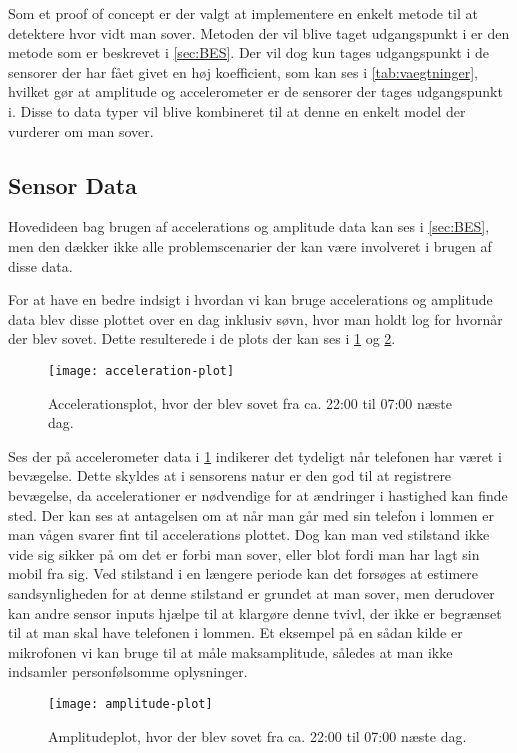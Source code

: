 Som et proof of concept er der valgt at implementere en enkelt metode til at detektere hvor vidt man sover.
Metoden der vil blive taget udgangspunkt i er den metode som er beskrevet i \cref{sec:BES}.
Der vil dog kun tages udgangspunkt i de sensorer der har fået givet en høj koefficient, som kan ses i \cref{tab:vaegtninger}, hvilket gør at amplitude og accelerometer er de sensorer der tages udgangspunkt i.
Disse to data typer vil blive kombineret til at denne en enkelt model der vurderer om man sover.

\subsection{Sensor Data}
Hovedideen bag brugen af accelerations og amplitude data kan ses i \cref{sec:BES}, men den dækker ikke alle problemscenarier der kan være involveret i brugen af disse data.

For at have en bedre indsigt i hvordan vi kan bruge accelerations og amplitude data blev disse plottet over en dag inklusiv søvn, hvor man holdt log for hvornår der blev sovet.
Dette resulterede i de plots der kan ses i \cref{fig:accplot} og \cref{fig:amplplot}.

\begin{figure}[h]
	\centering
	\texttt{[image: acceleration-plot]}
	\caption{Accelerationsplot, hvor der blev sovet fra ca. 22:00 til 07:00 næste dag.}\label{fig:accplot}
\end{figure}

Ses der på accelerometer data i \cref{fig:accplot} indikerer det tydeligt når telefonen har været i bevægelse.
Dette skyldes at i sensorens natur er den god til at registrere bevægelse, da accelerationer er nødvendige for at ændringer i hastighed kan finde sted.
Der kan ses at antagelsen om at når man går med sin telefon i lommen er man vågen svarer fint til accelerations plottet.
Dog kan man ved stilstand ikke vide sig sikker på om det er forbi man sover, eller blot fordi man har lagt sin mobil fra sig.
Ved stilstand i en længere periode kan det forsøges at estimere sandsynligheden for at denne stilstand er grundet at man sover, men derudover kan andre sensor inputs hjælpe til at klargøre denne tvivl, der ikke er begrænset til at man skal have telefonen i lommen.
Et eksempel på en sådan kilde er mikrofonen vi kan bruge til at måle maksamplitude, således at man ikke indsamler personfølsomme oplysninger.

\begin{figure}[h]
	\centering
	\texttt{[image: amplitude-plot]}
	\caption{Amplitudeplot, hvor der blev sovet fra ca. 22:00 til 07:00 næste dag.}\label{fig:amplplot}
\end{figure}

